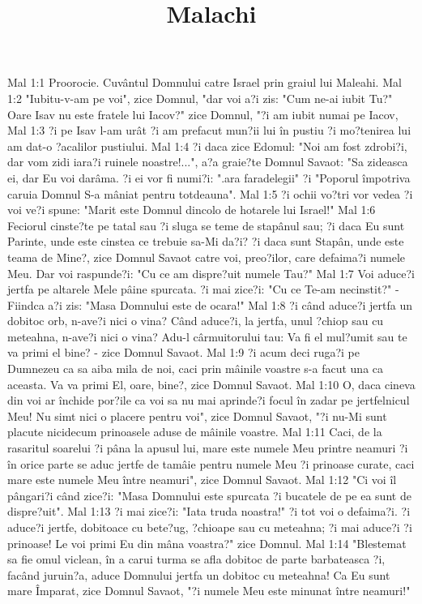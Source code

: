 

\title{Malachi}

Mal 1:1  Proorocie. Cuvântul Domnului catre Israel prin graiul lui Maleahi.
Mal 1:2  "Iubitu-v-am pe voi", zice Domnul, "dar voi a?i zis: "Cum ne-ai iubit Tu?" Oare Isav nu este fratele lui Iacov?" zice Domnul, "?i am iubit numai pe Iacov,
Mal 1:3  ?i pe Isav l-am urât ?i am prefacut mun?ii lui în pustiu ?i mo?tenirea lui am dat-o ?acalilor pustiului.
Mal 1:4  ?i daca zice Edomul: "Noi am fost zdrobi?i, dar vom zidi iara?i ruinele noastre!...", a?a graie?te Domnul Savaot: "Sa zideasca ei, dar Eu voi darâma. ?i ei vor fi numi?i: ".ara faradelegii" ?i "Poporul împotriva caruia Domnul S-a mâniat pentru totdeauna".
Mal 1:5  ?i ochii vo?tri vor vedea ?i voi ve?i spune: "Marit este Domnul dincolo de hotarele lui Israel!"
Mal 1:6  Feciorul cinste?te pe tatal sau ?i sluga se teme de stapânul sau; ?i daca Eu sunt Parinte, unde este cinstea ce trebuie sa-Mi da?i? ?i daca sunt Stapân, unde este teama de Mine?, zice Domnul Savaot catre voi, preo?ilor, care defaima?i numele Meu. Dar voi raspunde?i: "Cu ce am dispre?uit numele Tau?"
Mal 1:7  Voi aduce?i jertfa pe altarele Mele pâine spurcata. ?i mai zice?i: "Cu ce Te-am necinstit?" - Fiindca a?i zis: "Masa Domnului este de ocara!"
Mal 1:8  ?i când aduce?i jertfa un dobitoc orb, n-ave?i nici o vina? Când aduce?i, la jertfa, unul ?chiop sau cu meteahna, n-ave?i nici o vina? Adu-l cârmuitorului tau: Va fi el mul?umit sau te va primi el bine? - zice Domnul Savaot.
Mal 1:9  ?i acum deci ruga?i pe Dumnezeu ca sa aiba mila de noi, caci prin mâinile voastre s-a facut una ca aceasta. Va va primi El, oare, bine?, zice Domnul Savaot.
Mal 1:10  O, daca cineva din voi ar închide por?ile ca voi sa nu mai aprinde?i focul în zadar pe jertfelnicul Meu! Nu simt nici o placere pentru voi", zice Domnul Savaot, "?i nu-Mi sunt placute nicidecum prinoasele aduse de mâinile voastre.
Mal 1:11  Caci, de la rasaritul soarelui ?i pâna la apusul lui, mare este numele Meu printre neamuri ?i în orice parte se aduc jertfe de tamâie pentru numele Meu ?i prinoase curate, caci mare este numele Meu între neamuri", zice Domnul Savaot.
Mal 1:12  "Ci voi îl pângari?i când zice?i: "Masa Domnului este spurcata ?i bucatele de pe ea sunt de dispre?uit".
Mal 1:13  ?i mai zice?i: "Iata truda noastra!" ?i tot voi o defaima?i. ?i aduce?i jertfe, dobitoace cu bete?ug, ?chioape sau cu meteahna; ?i mai aduce?i ?i prinoase! Le voi primi Eu din mâna voastra?" zice Domnul.
Mal 1:14  "Blestemat sa fie omul viclean, în a carui turma se afla dobitoc de parte barbateasca ?i, facând juruin?a, aduce Domnului jertfa un dobitoc cu meteahna! Ca Eu sunt mare Împarat, zice Domnul Savaot, "?i numele Meu este minunat între neamuri!"
